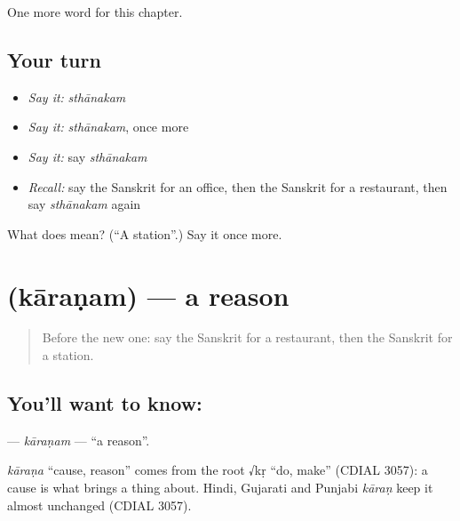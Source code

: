 \begin{grammarlens}[title={What you've built}]
One more word for this chapter.
\end{grammarlens}

\subsection*{Your turn}
\begin{itemize}
\raggedright
  \item \emph{Say it:} \emph{sthānakam}
  \item \emph{Say it:} \emph{sthānakam}, once more
  \item \emph{Say it:} say \emph{sthānakam}
  \item \emph{Recall:} say the Sanskrit for an office, then the Sanskrit for a restaurant, then say \emph{sthānakam} again
\end{itemize}

\begin{tcolorbox}[breakable,colback=teal!4,colframe=teal!35!black,title={Before you move on}]
What does  mean? (\textquotedblleft{}A station\textquotedblright{}.) Say it once more.
\end{tcolorbox}
\section[\texorpdfstring{\sk{कारणम्} (kāraṇam)}{कारणम् (kāraṇam)}]{ (kāraṇam) — a reason}

\label{lesson:SA-C97-karanam}



\begin{quote}
Before the new one: say the Sanskrit for a restaurant, then the Sanskrit for a station.
\end{quote}

\subsection*{You'll want to know: }
\textbf{} — \emph{kāraṇam} — \textquotedblleft{}a reason\textquotedblright{}.

\begin{cousinweb}
\emph{kāraṇa} \textquotedblleft{}cause, reason\textquotedblright{} comes from the root √kṛ \textquotedblleft{}do, make\textquotedblright{} (CDIAL 3057): a cause is what brings a thing about. Hindi, Gujarati and Punjabi \emph{kāraṇ} keep it almost unchanged (CDIAL 3057).
\end{cousinweb}

